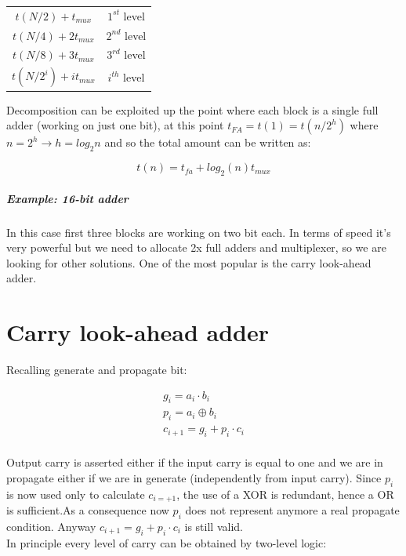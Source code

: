 \begin{center}
\begin{tabular}{|c|c|}
  \hline
  $t(N/2)+t_{mux}$&     $1^{st}$ level\\
  $t(N/4)+2t_{mux}$&    $2^{nd}$ level\\
  $t(N/8)+3t_{mux}$&    $3^{rd}$ level\\
  $t(N/2^i)+it_{mux}$&  $i^{th}$ level\\
  \hline
\end{tabular}
\end{center}

Decomposition can be exploited up the point where each block is a single full
adder (working on just one bit), at this point $t_{FA}=t(1)=t(n/2^h)$
where $n=2^h \rightarrow h=log_2 n$
and so the total amount can be written as:

$$t(n)=t_{fa}+log_2(n) t_{mux}$$

\subparagraph{Example: 16-bit adder}

In this case first three blocks are working on two bit each. In terms of speed
it's very powerful but we need to allocate 2x full adders and multiplexer, so
we are looking for other solutions. One of the most popular is the
carry look-ahead adder.


\section{Carry look-ahead adder}
 Recalling generate and propagate bit:

 \begin{eqnarray*}
 g_i=a_i \cdot b_i\\
 p_i=a_i \oplus b_i\\
 c_{i+1}=g_i+p_i \cdot c_i\\
 \end{eqnarray*}

Output carry is asserted either if the input carry is equal to one and we are
in propagate either if we are in generate (independently from input carry).
Since $p_i$ is now used only to calculate $c_{i=+1}$, the use of a XOR is
redundant, hence a OR is sufficient.As a consequence now $p_i$ does not
represent anymore a real propagate condition. Anyway $c_{i+1}=g_i+p_i \cdot c_i$
is still valid.\\
In principle every level of carry can be obtained by two-level logic:


